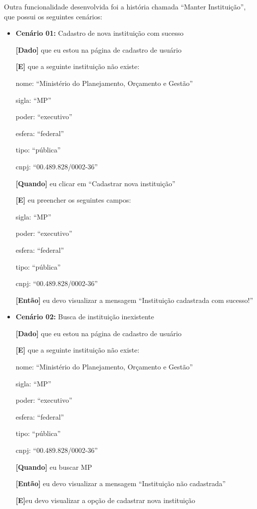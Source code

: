 Outra funcionalidade desenvolvida foi a história chamada ``Manter Instituição'', que possui os seguintes cenários:

\begin{itemize}
\item\textbf{Cenário 01:} Cadastro de nova instituição com sucesso

\textbf{[Dado]} que eu estou na página de cadastro de usuário

\textbf{[E]} que a seguinte instituição não existe:

  	\subitem nome: ``Ministério do Planejamento, Orçamento e Gestão''

  	\subitem sigla: ``MP''

 	\subitem poder: ``executivo''

 	\subitem esfera: ``federal''

  	\subitem tipo: ``pública''

  	\subitem cnpj: ``00.489.828/0002-36''

\textbf{[Quando]} eu clicar em ``Cadastrar nova instituição''

\textbf{[E]} eu preencher os seguintes campos:

  	\subitem sigla: ``MP''

  	\subitem poder: ``executivo''

  	\subitem esfera: ``federal''

  	\subitem tipo: ``pública''

  	\subitem cnpj: ``00.489.828/0002-36''

\textbf{[Então]} eu devo visualizar a mensagem ``Instituição cadastrada com sucesso!''

\item\textbf{Cenário 02:} Busca de instituição inexistente

\textbf{[Dado]} que eu estou na página de cadastro de usuário

\textbf{[E]} que a seguinte instituição não existe:

 \subitem nome: ``Ministério do Planejamento, Orçamento e Gestão''

  \subitem sigla: ``MP''

  \subitem poder: ``executivo''

  \subitem esfera: ``federal''

  \subitem tipo: ``pública''
  
  \subitem cnpj: ``00.489.828/0002-36''

\textbf{[Quando]} eu buscar MP

\textbf{[Então]} eu devo visualizar a mensagem ``Instituição não cadastrada''

\textbf{[E]}eu devo visualizar a opção de cadastrar nova instituição
\end{itemize}

